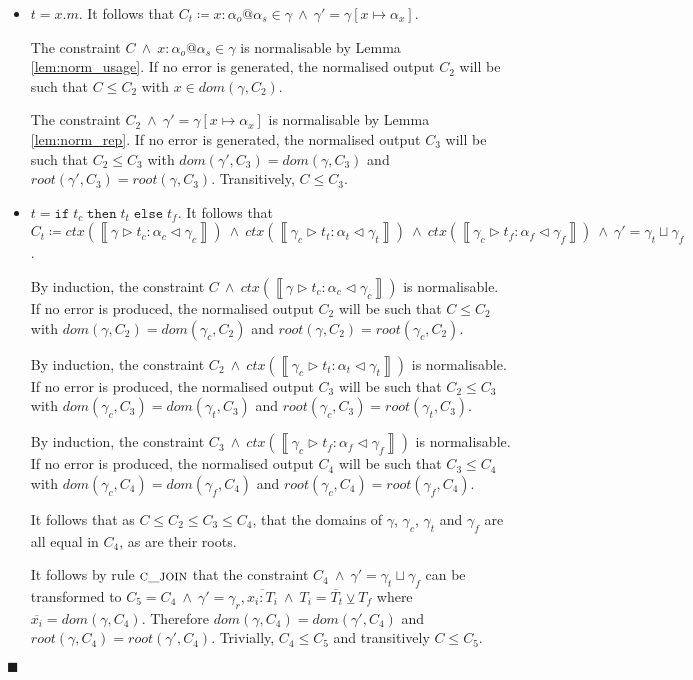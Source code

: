 \documentclass[preprint]{sigplanconf}
\newcommand{\lemref}[1]{Lemma \ref{#1}}
\newcommand{\inferrule}[4]{\left\llbracket #1 \triangleright #2 : #3 \triangleleft #4 \right\rrbracket}
\newcommand{\ift}[3]{\mathtt{if} \; #1 \; \mathtt{then} \; #2 \; \mathtt{else} \; #3}
\newcommand{\cand}{\:\wedge\:}
\newcommand{\qed}{$\blacksquare$}
\newenvironment{proof}{\vspace{1ex}\noindent{\bf Proof}\hspace{0.5em}}
  {\hfill\qed\vspace{1ex}}
\begin{document}
\begin{proof}
\begin{itemize}
\item $t = x.m$.
It follows that
$C_t \coloneqq x : \alpha_o@\alpha_s \in \gamma \cand
\gamma' = \gamma[x \mapsto \alpha_x]
$.

The constraint $C \cand x : \alpha_o@\alpha_s \in \gamma$ is normalisable
by \lemref{lem:norm_usage}. If no error is generated, the normalised output
$C_2$ will be such that $C \leq C_2$ with $x \in dom(\gamma, C_2)$.

The constraint $C_2 \cand \gamma' = \gamma[x \mapsto \alpha_x]$ is normalisable
by \lemref{lem:norm_rep}. If no error is generated, the normalised output $C_3$ will be such that $C_2 \leq C_3$ with
$dom(\gamma', C_3) = dom(\gamma, C_3)$ and $root(\gamma', C_3) = root(\gamma, C_3)$. Transitively, $C \leq C_3$.

\item $t = \ift{t_c}{t_t}{t_f}$.
It follows that
$C_t \coloneqq
ctx(\inferrule{\gamma}{t_c}{\alpha_c}{\gamma_c}) \cand
ctx(\inferrule{\gamma_c}{t_t}{\alpha_t}{\gamma_t}) \cand
ctx(\inferrule{\gamma_c}{t_f}{\alpha_f}{\gamma_f}) \cand
\gamma' = \gamma_t \sqcup \gamma_f
$.

By induction, the constraint
$C \cand ctx(\inferrule{\gamma}{t_c}{\alpha_c}{\gamma_c})$ is normalisable.
If no error is produced, the normalised output $C_2$ will be such that
$C \leq C_2$ with $dom(\gamma, C_2) = dom(\gamma_c, C_2)$ and
$root(\gamma, C_2) = root(\gamma_c, C_2)$.

By induction, the constraint
$C_2 \cand ctx(\inferrule{\gamma_c}{t_t}{\alpha_t}{\gamma_t})$ is normalisable.
If no error is produced, the normalised output $C_3$ will be such that
$C_2 \leq C_3$ with $dom(\gamma_c, C_3) = dom(\gamma_t, C_3)$ and
$root(\gamma_c, C_3) = root(\gamma_t, C_3)$.

By induction, the constraint
$C_3 \cand ctx(\inferrule{\gamma_c}{t_f}{\alpha_f}{\gamma_f})$ is normalisable.
If no error is produced, the normalised output $C_4$ will be such that
$C_3 \leq C_4$ with $dom(\gamma_c, C_4) = dom(\gamma_f, C_4)$ and
$root(\gamma_c, C_4) = root(\gamma_f, C_4)$.

It follows that as $C \leq C_2 \leq C_3 \leq C_4$, that the domains
of $\gamma$, $\gamma_c$, $\gamma_t$ and $\gamma_f$ are all equal in $C_4$,
as are their roots.

It follows by rule $\textsc{c\_join}$ that the constraint
$C_4 \cand \gamma' = \gamma_t \sqcup \gamma_f$ can be transformed to
$C_5 = C_4 \cand \gamma' = \gamma_r, \overline{x_i : T_i} \cand \overline{T_i = T_t \veebar T_f}$ 
where $\overline{x_i} = dom(\gamma, C_4)$. Therefore $dom(\gamma, C_4) = dom(\gamma', C_4)$ and $root(\gamma, C_4) = root(\gamma', C_4)$. Trivially, $C_4 \leq C_5$ and transitively $C \leq C_5$.

\end{itemize}
\end{proof}
\end{document}
